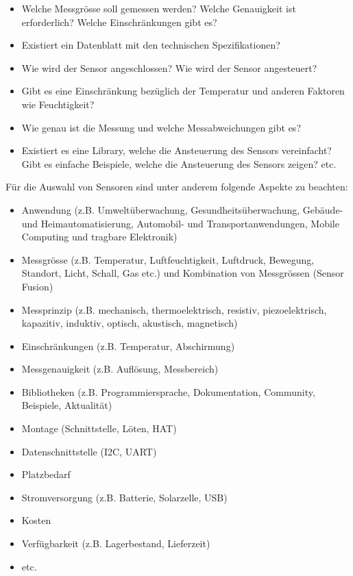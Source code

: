 \documentclass[
  11pt,
  a4paper,
  oneside, openany  ,captions=tableheading
]{scrbook}
\providecommand{\tightlist}{%
  \setlength{\itemsep}{0pt}\setlength{\parskip}{0pt}}
\theoremstyle{remark}
\begin{document}
\begin{itemize}
\tightlist
\item
  Welche Messgrösse soll gemessen werden? Welche Genauigkeit ist
  erforderlich? Welche Einschränkungen gibt es?
\item
  Existiert ein Datenblatt mit den technischen Spezifikationen?\\
\item
  Wie wird der Sensor angeschlossen? Wie wird der Sensor angesteuert?\\
\item
  Gibt es eine Einschränkung bezüglich der Temperatur und anderen
  Faktoren wie Feuchtigkeit?
\item
  Wie genau ist die Messung und welche Messabweichungen gibt es?
\item
  Existiert es eine Library, welche die Ansteuerung des Sensors
  vereinfacht? Gibt es einfache Beispiele, welche die Ansteuerung des
  Sensors zeigen? etc.
\end{itemize}

Für die Auswahl von Sensoren sind unter anderem folgende Aspekte zu
beachten:

\begin{itemize}
\tightlist
\item
  Anwendung (z.B. Umweltüberwachung, Gesundheitsüberwachung, Gebäude-
  und Heimautomatisierung, Automobil- und Transportanwendungen, Mobile
  Computing und tragbare Elektronik)
\item
  Messgrösse (z.B. Temperatur, Luftfeuchtigkeit, Luftdruck, Bewegung,
  Standort, Licht, Schall, Gas etc.) und Kombination von Messgrössen
  (Sensor Fusion)
\item
  Messprinzip (z.B. mechanisch, thermoelektrisch, resistiv,
  piezoelektrisch, kapazitiv, induktiv, optisch, akustisch, magnetisch)
\item
  Einschränkungen (z.B. Temperatur, Abschirmung)
\item
  Messgenauigkeit (z.B. Auflösung, Messbereich)
\item
  Bibliotheken (z.B. Programmiersprache, Dokumentation, Community,
  Beispiele, Aktualität)
\item
  Montage (Schnittstelle, Löten, HAT)
\item
  Datenschnittstelle (I2C, UART)
\item
  Platzbedarf
\item
  Stromversorgung (z.B. Batterie, Solarzelle, USB)
\item
  Kosten
\item
  Verfügbarkeit (z.B. Lagerbestand, Lieferzeit)
\item
  etc.
\end{itemize}
\end{document}
